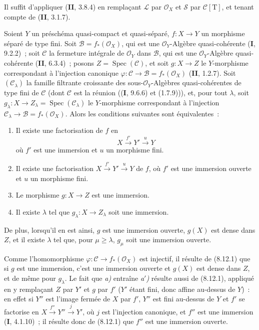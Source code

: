 Il suffit d'appliquer (\textbf{II}, 3.8.4) en remplaçant $\mathcal L$ par
$\mathcal O_X$ et $\mathcal S$ par $\mathcal C[\mathrm T]$, et tenant
compte de (\textbf{II}, 3.1.7).
\begin{proposition}[8.12.3]
Soient $Y$ un préschéma quasi-compact et quasi-séparé, $f:X\to Y$ un
morphisme séparé de type fini. Soit $\mathcal B=f_*(\mathcal O_X)$, qui est
une $\mathcal O_Y$-Algèbre quasi-cohérente \textup{(\textbf{I}, 9.2.2)}~; soit $\mathcal C$ la
fermeture intégrale de $\mathcal O_Y$ dans $\mathcal B$, qui est une
$\mathcal O_Y$-Algèbre quasi-cohérente \textup{(\textbf{II}, 6.3.4)}~; posons
$Z=\operatorname{Spec}(\mathcal C)$, et soit $g:X\to Z$ le $Y$-morphisme
correspondant à l'injection canonique
$\varphi:\mathcal C\to\mathcal B=f_*(\mathcal O_X)$ \textup{(\textbf{II}, 1.2.7)}. Soit
$(\mathcal C_\lambda)$ la famille filtrante croissante des
sous-$\mathcal O_Y$-Algèbres quasi-cohérentes de type fini de $\mathcal C$
(dont $\mathcal C$ est la réunion \textup{((\textbf{I}, 9.6.6)} et \textup{(1.7.9)))}, et, pour tout
$\lambda$, soit $g_\lambda:X\to Z_\lambda=\operatorname{Spec}(\mathcal C_\lambda)$ le $Y$-morphisme correspondant à l'injection
$\mathcal C_\lambda\to\mathcal B=f_*(\mathcal O_X)$. Alors les conditions
suivantes sont équivalentes~:
\begin{enumerate}
\item[\emph{a)}] Il existe une factorisation de $f$ en
\[
X\xrightarrow{f'}Y'\xrightarrow{u}Y
\]
où $f'$ est une immersion et $u$ un morphisme fini.
\item[\emph{a$'$)}] Il existe une factorisation
$X\xrightarrow{f'}Y'\xrightarrow{u}Y$ de $f$, où $f'$ est une immersion
ouverte et $u$ un morphisme fini.
\item[\emph{b)}] Le morphisme $g:X\to Z$ est une immersion.
\item[\emph{c)}] Il existe $\lambda$ tel que
$g_\lambda:X\to Z_\lambda$ soit une immersion.
\end{enumerate}

De plus, lorsqu'il en est ainsi, $g$ est une immersion ouverte, $g(X)$ est
dense dans $Z$, et il existe $\lambda$ tel que, pour $\mu\geq\lambda$,
$g_\mu$ soit une immersion ouverte.
\end{proposition}

Comme l'homomorphisme $\varphi:\mathcal C\to f_*(\mathcal O_X)$ est
injectif, il résulte de (8.12.1) que si $g$ est une immersion, c'est une
immersion ouverte et $g(X)$ est dense dans $Z$, et de même pour
$g_\lambda$. Le fait que \emph{a)} entraîne \emph{a$'$)} résulte aussi de
(8.12.1), appliqué en y remplaçant $Z$ par $Y'$ et $g$ par $f'$ ($Y'$ étant
fini, donc affine au-dessus de $Y$)~: en effet si $Y''$ est l'image fermée de
$X$ par $f'$, $Y''$ est fini au-dessus de $Y$ et $f'$ se factorise en
$X\xrightarrow{f''}Y''\xrightarrow{j}Y'$, où $j$ est l'injection canonique,
et $f''$ est une immersion (\textbf{I}, 4.1.10)~; il résulte donc de (8.12.1) que
$f''$ est une immersion ouverte.

